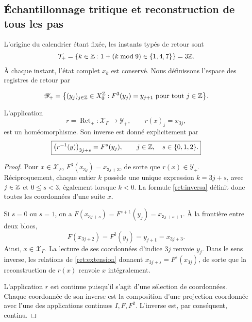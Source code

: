 \subsection{Échantillonnage tritique et reconstruction de tous les pas}

L’origine du calendrier étant fixée, les instants typés de retour sont
\[
 \mathcal T_+
 =\{k\in\mathbb Z:1+(k\bmod 9)\in\{1,4,7\}\}=3\mathbb Z.
\]
À chaque instant, l’état complet \(x_k\) est conservé.
Nous définissons l’espace des registres de retour par

\begin{equation}
 \mathscr Y_+
 =\bigl\{(y_j)_{j\in\mathbb Z}\in X_0^{\mathbb Z}:
                 F^3(y_j)=y_{j+1}\text{ pour tout }j\in\mathbb Z\bigr\}.
 \label{ret:registros}
\end{equation}

\begin{theorem}
\label{ret:homeomorfismo}
L'application
\[
 r=\operatorname{Ret}_+:\mathscr X_F\longrightarrow\mathscr Y_+,
 \qquad r(x)_j=x_{3j},
\]
est un homéomorphisme. Son inverse est donné explicitement par
\begin{equation}
 \boxed{
  \bigl(r^{-1}(y)\bigr)_{3j+s}=F^s(y_j),
  \qquad j\in\mathbb Z,\quad s\in\{0,1,2\}.}
 \label{ret:inversa}
\end{equation}
\end{theorem}
\begin{proof}
Pour \(x\in\mathscr X_F\),
\(F^3(x_{3j})=x_{3j+3}\), de sorte que \(r(x)\in\mathscr Y_+\).
Réciproquement, chaque entier \(k\) possède une unique expression
\(k=3j+s\), avec \(j\in\mathbb Z\) et \(0\le s<3\), également lorsque
\(k<0\). La formule \eqref{ret:inversa} définit donc toutes les
coordonnées d’une suite \(x\).


Si \(s=0\) ou \(s=1\), on a
\(F(x_{3j+s})=F^{s+1}(y_j)=x_{3j+s+1}\).
À la frontière entre deux blocs,
\[
 F(x_{3j+2})=F^3(y_j)=y_{j+1}=x_{3j+3}.
\]
Ainsi, \(x\in\mathscr X_F\).
La lecture de ses coordonnées d’indice \(3j\) renvoie \(y_j\).
Dans le sens inverse, les relations de \eqref{ret:extension} donnent
\(x_{3j+s}=F^s(x_{3j})\), de sorte que la reconstruction de \(r(x)\)
renvoie \(x\) intégralement.

L’application \(r\) est continue puisqu’il s’agit d’une sélection de coordonnées.
Chaque coordonnée de son inverse est la composition d’une projection
coordonnée avec l’une des applications continues \(I,F,F^2\).
L’inverse est, par conséquent, continu.
\end{proof}

